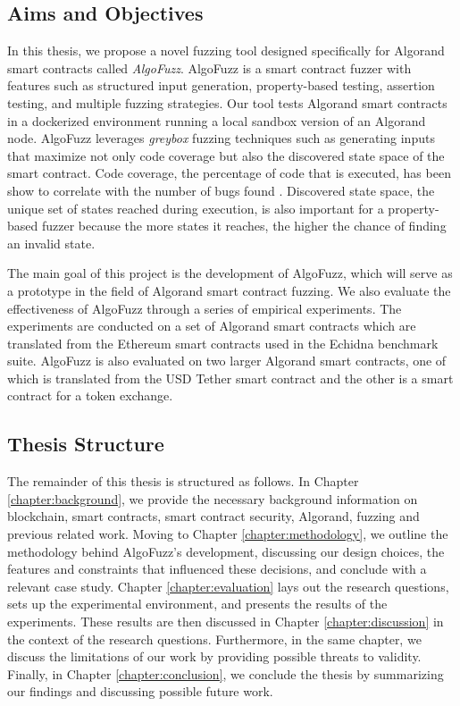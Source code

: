 \subsection*{Aims and Objectives}
In this thesis, we propose a novel fuzzing tool designed specifically for Algorand smart contracts called \textit{AlgoFuzz}.
AlgoFuzz is a smart contract fuzzer with features such as structured input generation, property-based testing, assertion testing, and multiple fuzzing strategies.
Our tool tests Algorand smart contracts in a dockerized environment running a local sandbox version of an Algorand node.
AlgoFuzz leverages \textit{greybox} fuzzing techniques such as generating inputs that maximize not only code coverage but also the discovered state space of the smart contract.
Code coverage, the percentage of code that is executed, has been show to correlate with the number of bugs found \cite{kochhar_code_2015}.
Discovered state space, the unique set of states reached during execution, is also important for a property-based fuzzer because the more states it reaches, the higher the chance of finding an invalid state.

The main goal of this project is the development of AlgoFuzz, which will serve as a prototype in the field of Algorand smart contract fuzzing.
We also evaluate the effectiveness of AlgoFuzz through a series of empirical experiments.
The experiments are conducted on a set of Algorand smart contracts which are translated from the Ethereum smart contracts used in the Echidna benchmark suite.
AlgoFuzz is also evaluated on two larger Algorand smart contracts, one of which is translated from the USD Tether \cite{etherscanio_tether_nodate} smart contract and the other is a smart contract for a token exchange.

\subsection*{Thesis Structure}
The remainder of this thesis is structured as follows.
In Chapter \ref{chapter:background}, we provide the necessary background information on blockchain, smart contracts, smart contract security, Algorand, fuzzing and previous related work.
Moving to Chapter \ref{chapter:methodology}, we outline the methodology behind AlgoFuzz's development, discussing our design choices, the features and constraints that influenced these decisions, and conclude with a relevant case study.
Chapter \ref{chapter:evaluation} lays out the research questions, sets up the experimental environment, and presents the results of the experiments.
These results are then discussed in Chapter \ref{chapter:discussion} in the context of the research questions. Furthermore, in the same chapter, we discuss the limitations of our work by providing possible threats to validity.
Finally, in Chapter \ref{chapter:conclusion}, we conclude the thesis by summarizing our findings and discussing possible future work.



